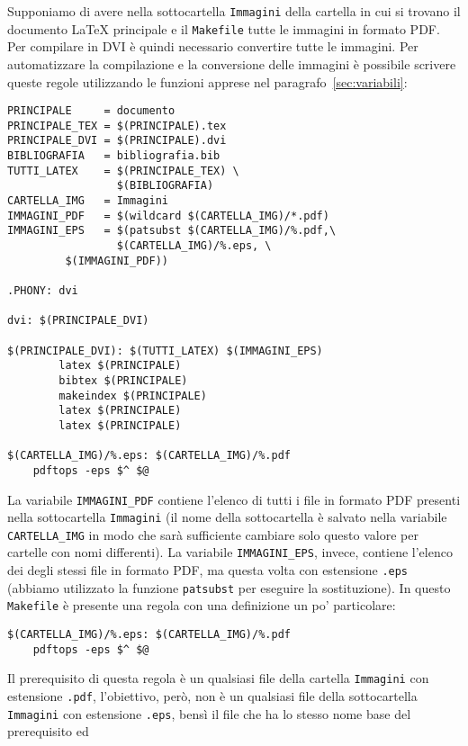 Supponiamo di avere nella sottocartella \texttt{Immagini} della cartella in cui
si trovano il documento \LaTeX{}
principale e il \texttt{Makefile} tutte le immagini in formato \textsc{PDF}.
Per compilare in \textsc{DVI} è quindi necessario convertire tutte le immagini.
Per automatizzare la compilazione e la conversione delle immagini è possibile
scrivere queste regole utilizzando le funzioni apprese nel
paragrafo~\ref{sec:variabili}:
\begin{lstlisting}[caption={\texttt{Makefile} in cui le immagini \textsc{PDF}
vengono convertite in \textsc{EPS} nella compilazione con \LaTeX.},label=lst:pdf-eps]
PRINCIPALE     = documento
PRINCIPALE_TEX = $(PRINCIPALE).tex
PRINCIPALE_DVI = $(PRINCIPALE).dvi
BIBLIOGRAFIA   = bibliografia.bib
TUTTI_LATEX    = $(PRINCIPALE_TEX) \
                 $(BIBLIOGRAFIA)
CARTELLA_IMG   = Immagini
IMMAGINI_PDF   = $(wildcard $(CARTELLA_IMG)/*.pdf)
IMMAGINI_EPS   = $(patsubst $(CARTELLA_IMG)/%.pdf,\
                 $(CARTELLA_IMG)/%.eps, \
		 $(IMMAGINI_PDF))

.PHONY: dvi

dvi: $(PRINCIPALE_DVI)

$(PRINCIPALE_DVI): $(TUTTI_LATEX) $(IMMAGINI_EPS)
        latex $(PRINCIPALE)
        bibtex $(PRINCIPALE)
        makeindex $(PRINCIPALE)
        latex $(PRINCIPALE)
        latex $(PRINCIPALE)

$(CARTELLA_IMG)/%.eps: $(CARTELLA_IMG)/%.pdf
	pdftops -eps $^ $@
\end{lstlisting} %
La variabile \texttt{IMMAGINI\_PDF} contiene l'elenco di tutti i file in formato
\textsc{PDF} presenti nella sottocartella \texttt{Immagini} (il nome della
sottocartella è salvato nella variabile \texttt{CARTELLA\_IMG} in modo che sarà
sufficiente cambiare solo questo valore per cartelle con nomi differenti).  La
variabile \texttt{IMMAGINI\_EPS}, invece, contiene l'elenco dei degli stessi
file in formato \textsc{PDF}, ma questa volta con estensione \texttt{.eps}
(abbiamo utilizzato la funzione \texttt{patsubst} per eseguire la sostituzione).
In questo \texttt{Makefile} è presente una regola con una definizione un po'
particolare:
\begin{lstlisting}
$(CARTELLA_IMG)/%.eps: $(CARTELLA_IMG)/%.pdf
	pdftops -eps $^ $@
\end{lstlisting} %
Il prerequisito di questa regola è un qualsiasi file della cartella
\texttt{Immagini} con estensione \texttt{.pdf}, l'obiettivo, però, non è un
qualsiasi file della sottocartella \texttt{Immagini} con estensione
\texttt{.eps}, bensì il file che ha lo stesso nome base del prerequisito ed
